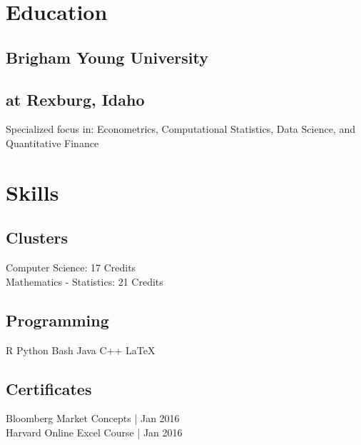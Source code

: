 \documentclass[letterpaper]{deedy-resume}
\begin{document}
\begin{minipage}[t]{0.31\textwidth}
\section{Education} 
\subsection{Brigham Young University}
\subsection{at Rexburg, Idaho}


Specialized focus in:
Econometrics, Computational Statistics,
Data Science, and Quantitative Finance

\section{Skills}
\subsection{Clusters}
\textbullet{} Computer Science: 17 Credits \\
\textbullet{} Mathematics - Statistics: 21 Credits

\sectionspace

\subsection{Programming}
\textbullet{} R \textbullet{} Python \textbullet{} Bash \textbullet{}
Java \textbullet{} C++ \textbullet{} \LaTeX{} \\

\sectionspace

\subsection{Certificates}
\textbullet{}Bloomberg Market Concepts | Jan 2016 \\
\textbullet{}Harvard Online Excel Course | Jan 2016
\sectionspace 


\end{minipage}
\end{document}
